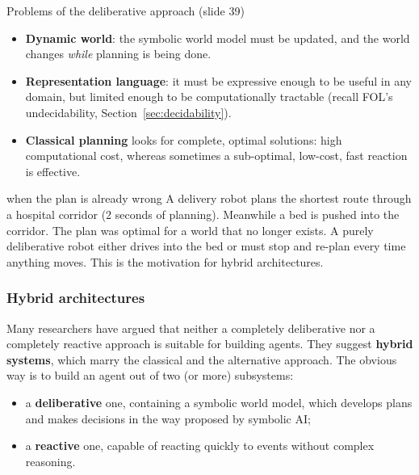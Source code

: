 \begin{nbfact}{Problems of the deliberative approach (slide 39)}
\begin{itemize}[nosep]
  \item \textbf{Dynamic world}: the symbolic world model must be updated, and the world
        changes \emph{while} planning is being done.
  \item \textbf{Representation language}: it must be expressive enough to be useful in any
        domain, but limited enough to be computationally tractable (recall FOL's
        undecidability, Section~\ref{sec:decidability}).
  \item \textbf{Classical planning} looks for complete, optimal solutions: high
        computational cost, whereas sometimes a sub-optimal, low-cost, fast reaction is
        effective.
\end{itemize}
\end{nbfact}

\begin{nbexample}{when the plan is already wrong}
\notinslides
A delivery robot plans the shortest route through a hospital corridor (2 seconds of
planning). Meanwhile a bed is pushed into the corridor. The plan was optimal for a world that
no longer exists. A purely deliberative robot either drives into the bed or must stop and
re-plan every time anything moves. This is the motivation for hybrid architectures.
\end{nbexample}

\subsubsection{Hybrid architectures}

Many researchers have argued that neither a completely deliberative nor a completely
reactive approach is suitable for building agents. They suggest \textbf{hybrid systems},
which marry the classical and the alternative approach. The obvious way is to build an
agent out of two (or more) subsystems:
\begin{itemize}[nosep]
  \item a \textbf{deliberative} one, containing a symbolic world model, which develops plans
        and makes decisions in the way proposed by symbolic AI;
  \item a \textbf{reactive} one, capable of reacting quickly to events without complex
        reasoning.
\end{itemize}

